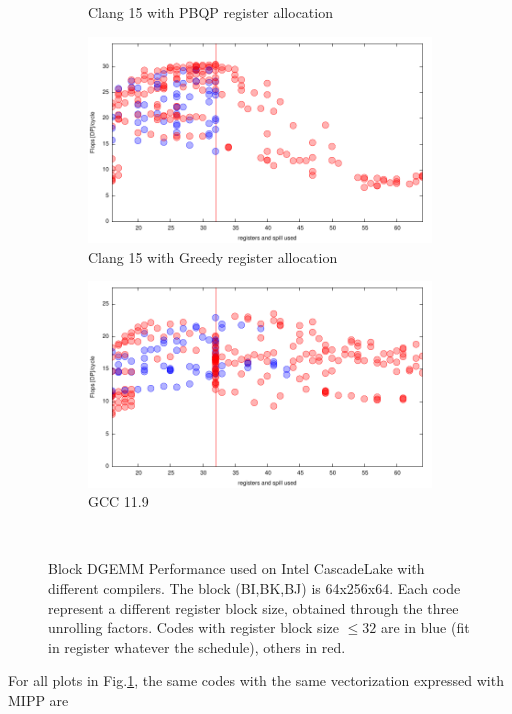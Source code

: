\documentclass[sigconf,review]{acmart}
\begin{document}
\begin{figure}[ht]
\begin{subfigure}[h]{0.45\textwidth}
  \caption{Clang 15 with PBQP register allocation}
  \end{subfigure}
  \begin{subfigure}[h]{0.45\textwidth}  
\includegraphics[width=\textwidth]{../benches/gemm/cascadelake-64x256x64/greedy.pdf}
  \caption{Clang 15 with Greedy register allocation}
  \end{subfigure}
  \begin{subfigure}[h]{0.45\textwidth}  
\includegraphics[width=\textwidth]{../benches/gemm/cascadelake-64x256x64/gcc-11.9.pdf}
  \caption{GCC 11.9}
  \end{subfigure}\hfill ~
  \caption{Block DGEMM Performance used on Intel CascadeLake with different compilers. The block (BI,BK,BJ) is 64x256x64. Each code represent a different register block size, obtained through the three unrolling factors. Codes with register block size $\leq 32$ are in blue (fit in register whatever the schedule), others in red.  \label{fig:cascadelake}}
\end{figure}
 For all plots in Fig.\ref{fig:cascadelake}, the same codes with the same vectorization expressed with MIPP are
\end{document}
